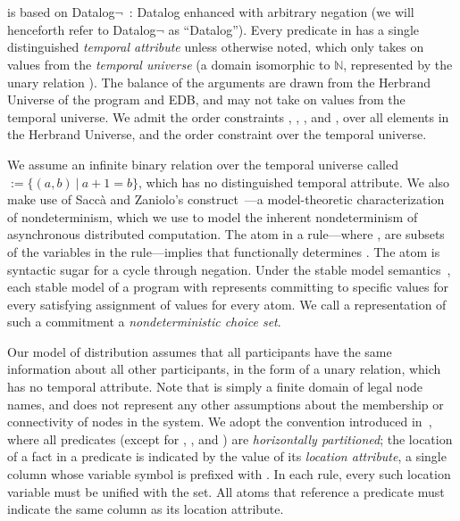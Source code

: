 \section{\large \bf \lang}
\label{sec:foundation}

\lang is based on Datalog$\lnot$~\cite{ullmanbook}: Datalog enhanced with
arbitrary negation (we will henceforth refer to Datalog$\lnot$ as ``Datalog'').
Every predicate in \lang has a single distinguished {\em temporal attribute} unless otherwise noted,
which only takes on values from the {\em temporal universe} (a domain isomorphic to $\mathbb{N}$,
represented by the unary relation ).
The balance of the arguments are drawn from the Herbrand Universe of the program and EDB, and may not take on values from the temporal universe.  We admit the order constraints \dedalus{<}, \dedalus{=}, \dedalus{!=}, and \dedalus{<=}, over all elements in the Herbrand Universe, and the order constraint \dedalus{<} over the temporal universe.

We assume an infinite binary relation over the temporal universe
called  $:= \{(a,b) \ | \ a + 1 = b\}$, which has no
distinguished temporal attribute.  We also make use of Sacc\`{a} and Zaniolo's  construct~\cite{sacca-zaniolo}---a model-theoretic characterization of nondeterminism, which we use to model the inherent nondeterminism of asynchronous distributed computation.  The atom  in a rule---where ,  are subsets of the variables in the rule---implies that  functionally determines .  The  atom is syntactic sugar for a cycle through negation.  Under the stable model semantics~\cite{stable-model}, each stable model of a program with  represents committing to specific  values for every satisfying assignment of  values for every  atom.  We call a representation of such a commitment a {\em nondeterministic choice set}.

Our model of distribution assumes that all participants have the same information about all other participants, in the form of a unary  relation, which has no temporal attribute. Note that  is simply a finite domain of legal node names, and does not represent any other assumptions about the membership or connectivity of nodes in the system. We adopt the convention introduced in~\cite{Loo:2005}, where all predicates (except for , , and ) are {\em horizontally partitioned};  the location of a fact in a predicate is indicated by the value of its {\em location attribute}, a single column whose variable symbol is prefixed with \dedalus{\#}.  In each \lang rule, every such location variable must be unified with the  set.  All atoms that reference a predicate must indicate the same column as its location attribute.

